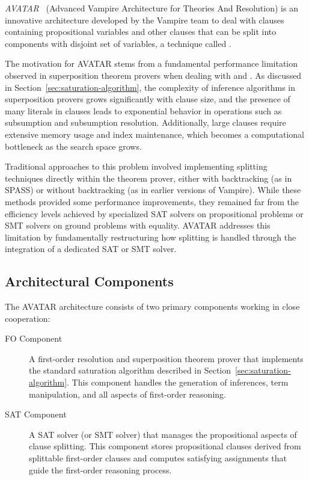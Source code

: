 \emph{AVATAR}~\cite{AVATAR} (Advanced Vampire Architecture for Theories And Resolution) is an innovative architecture developed by the Vampire team to deal with clauses containing propositional variables and other clauses that can be split into components with disjoint set of variables, a technique called .

The motivation for AVATAR stems from a fundamental performance limitation observed in superposition theorem provers when dealing with  and .
As discussed in Section~\ref{sec:saturation-algorithm}, the complexity of inference algorithms in superposition provers grows significantly with clause size, and the presence of many literals in clauses leads to exponential behavior in operations such as subsumption and subsumption resolution.
Additionally, large clauses require extensive memory usage and index maintenance, which becomes a computational bottleneck as the search space grows.

Traditional approaches to this problem involved implementing splitting techniques directly within the theorem prover, either with backtracking (as in SPASS) or without backtracking (as in earlier versions of Vampire).
While these methods provided some performance improvements, they remained far from the efficiency levels achieved by specialized SAT solvers on propositional problems or SMT solvers on ground problems with equality.
AVATAR addresses this limitation by fundamentally restructuring how splitting is handled through the integration of a dedicated SAT or SMT solver.

\subsection{Architectural Components}\label{subsec:avatar-components}

The AVATAR architecture consists of two primary components working in close cooperation:

\begin{description}
  \item[FO Component] A first-order resolution and superposition theorem prover that implements the standard saturation algorithm described in Section~\ref{sec:saturation-algorithm}.
                     This component handles the generation of inferences, term manipulation, and all aspects of first-order reasoning.
  \item[SAT Component] A SAT solver (or SMT solver) that manages the propositional aspects of clause splitting.
                       This component stores propositional clauses derived from splittable first-order clauses and computes satisfying assignments that guide the first-order reasoning process.
\end{description}

